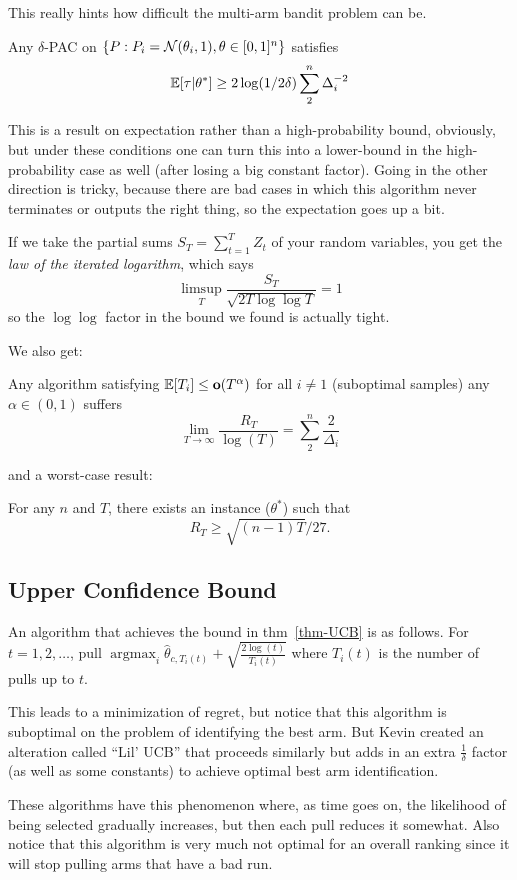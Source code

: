 \documentclass[12pt]{article}
\DeclareMathOperator*{\argmax}{argmax}
\begin{document}
This really hints how difficult the multi-arm bandit problem can be. 
\begin{thm}
	Any $\delta$-PAC on $\{P:P_i=\mathcal{N}(\theta_i,1),\theta\in[0,1]^n\}$ satisfies 
	\[\mathbb{E}[\tau|\theta^\ast]\ge 2\log(1/2\delta)\sum_2^n\Delta_i^{-2}\]
\end{thm}
\begin{rmk}
	This is a result on expectation rather than a high-probability bound, obviously, but under these conditions one can turn this into a lower-bound in the high-probability case 
	as well (after losing a big constant factor). Going in the other direction is tricky, because there are bad cases in which this algorithm never terminates or outputs the right thing, so the 
	expectation goes up a bit.
\end{rmk}
\begin{rmk}
	If we take the partial sums $S_T=\sum_{t=1}^T Z_t$ of your random variables, you get the \textit{law of the iterated logarithm}, which 
	says 
	\[\limsup_T\frac{S_T}{\sqrt{2T\log\log T}}=1\]
	so the $\log\log$ factor in the bound we found is actually tight.
\end{rmk}
We also get:
\begin{thm}\label{thm-UCB}
	Any algorithm satisfying $\mathbb{E}[T_i]\le\mathbf o(T^\alpha)$ for all $i\ne 1$ (suboptimal samples) any $\alpha\in(0,1)$ suffers 
	\[\lim_{T\to\infty}\frac{R_T}{\log(T)}=\sum_2^n\frac{2}{\Delta_i}\]
\end{thm}
and a worst-case result:
\begin{thm}
	For any $n$ and $T$, there exists an instance ($\theta^\ast$) such that 
	\[R_T\ge\sqrt{(n-1)T}/27.\]
\end{thm}
\subsection{Upper Confidence Bound}
An algorithm that achieves the bound in thm~\ref{thm-UCB} is as follows. For $t=1,2,\dots$,
pull $\argmax_i\hat\theta_{c,T_i(t)}+\sqrt{\frac{2\log(t)}{T_i(t)}}$ where $T_i(t)$ is the number of pulls up to $t$.

This leads to a minimization of regret, but notice that this algorithm is suboptimal on the problem of identifying the best arm. But Kevin 
created an alteration called ``Lil' UCB'' that proceeds similarly but adds in an extra $\frac{1}{\delta}$ factor (as well as some constants) to achieve optimal best arm identification.

These algorithms have this phenomenon where, as time goes on, the likelihood of being selected gradually increases, but then each pull reduces it somewhat. Also notice that this algorithm 
is very much not optimal for an overall ranking since it will stop pulling arms that have a bad run. 
\end{document}

